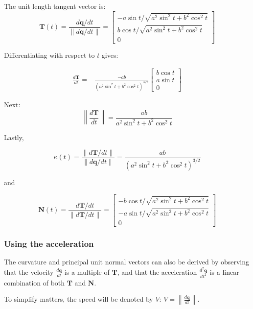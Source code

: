 \documentclass{article}
\begin{document}
The unit length tangent vector is:
\[\mathbf{T}(t) = \frac{d\mathbf{q}/dt}{\|d\mathbf{q}/dt\|} = \begin{bmatrix} -a\sin t / \sqrt{a^2\sin^2 t + b^2 \cos^2 t} \\ b\cos t / \sqrt{a^2\sin^2 t + b^2 \cos^2 t} \\ 0 \end{bmatrix}\]

Differentiating with respect to \(t\) gives:

\begin{align*}
\frac{d\mathbf{T}}{dt} = & \frac{-ab}{(a^2\sin^2 t + b^2 \cos^2 t)^{3/2}}\begin{bmatrix} 
b\cos t \\ 
a \sin t \\ 
0 \end{bmatrix}
\end{align*}

Next:
\[\left\|\frac{d\mathbf{T}}{dt}\right\| = \frac{ab}{a^2\sin^2 t + b^2 \cos^2 t}\]

Lastly, 

\[\kappa(t) = \frac{\|d\mathbf{T}/dt\|}{\|d\mathbf{q}/dt\|} = \frac{ab}{(a^2\sin^2 t + b^2 \cos^2 t)^{3/2}}\]

and 

\[\mathbf{N}(t) = \frac{d\mathbf{T}/dt}{\|d\mathbf{T}/dt\|} = \begin{bmatrix} -b\cos t /\sqrt{a^2\sin^2 t + b^2 \cos^2 t} \\ -a\sin t / \sqrt{a^2\sin^2 t + b^2 \cos^2 t} \\ 0 \end{bmatrix}\]




\subsubsection*{Using the acceleration}

The curvature and principal unit normal vectors can also be derived by observing that the velocity \(\frac{d\mathbf{q}}{dt}\) is a multiple of \(\mathbf{T}\), and that the acceleration \(\frac{d^2\mathbf{q}}{dt^2}\) is a linear combination of both \(\mathbf{T}\) and \(\mathbf{N}\).  

To simplify matters, the speed will be denoted by \(V\): \(V = \left\|\frac{d\mathbf{q}}{dt}\right\|\).  
\end{document}

